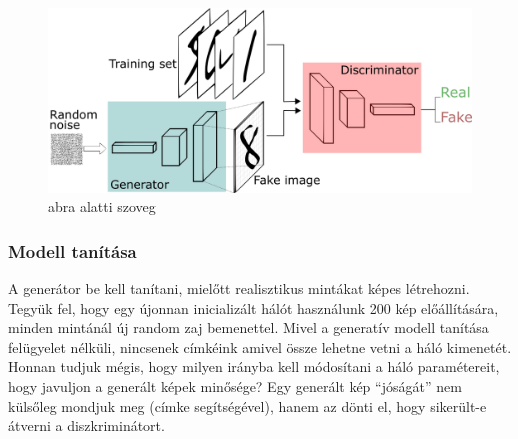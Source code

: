 

\begin{figure}[ht]
	\centering
	\includegraphics[width=0.9\columnwidth]{figures/gan_struct.png}
	\caption{abra alatti szoveg}
	\label{fig:gan_struct}
\end{figure}

\subsubsection{Modell tanítása}

A generátor be kell tanítani, mielőtt realisztikus mintákat képes létrehozni. Tegyük fel, hogy egy újonnan inicializált hálót használunk 200 kép előállítására, minden mintánál új random zaj bemenettel. Mivel a generatív modell tanítása felügyelet nélküli, nincsenek címkéink amivel össze lehetne vetni a háló kimenetét. Honnan tudjuk mégis, hogy milyen irányba kell módosítani a háló paramétereit, hogy javuljon a generált képek minősége? Egy generált kép ``jóságát'' nem külsőleg mondjuk meg (címke segítségével), hanem az dönti el, hogy sikerült-e átverni a diszkriminátort.

